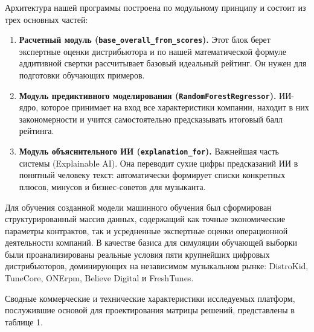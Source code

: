 \documentclass[14pt, a4paper]{extarticle}
\begin{document}
Архитектура нашей программы построена по модульному принципу и состоит из трех основных частей:
\begin{enumerate}
    \item \textbf{Расчетный модуль (\texttt{base\_overall\_from\_scores}).} Этот блок берет экспертные оценки дистрибьютора и по нашей математической формуле аддитивной свертки рассчитывает базовый идеальный рейтинг. Он нужен для подготовки обучающих примеров.
    \item \textbf{Модуль предиктивного моделирования (\texttt{RandomForestRegressor}).} ИИ-ядро, которое принимает на вход все характеристики компании, находит в них закономерности и учится самостоятельно предсказывать итоговый балл рейтинга.
    \item \textbf{Модуль объяснительного ИИ (\texttt{explanation\_for}).} Важнейшая часть системы (Explainable AI). Она переводит сухие цифры предсказаний ИИ в понятный человеку текст: автоматически формирует списки конкретных плюсов, минусов и бизнес-советов для музыканта.
\end{enumerate}
Для обучения созданной модели машинного обучения был сформирован структурированный массив данных, содержащий как точные экономические параметры контрактов, так и усредненные экспертные оценки операционной деятельности компаний. В качестве базиса для симуляции обучающей выборки были проанализированы реальные условия пяти крупнейших цифровых дистрибьюторов, доминирующих на независимом музыкальном рынке: DistroKid, TuneCore, ONErpm, Believe Digital и FreshTunes. 

Сводные коммерческие и технические характеристики исследуемых платформ, послужившие основой для проектирования матрицы решений, представлены в таблице 1.


\begin{table}[!htbp] 
\centering
\caption{Коммерческие условия и экспертные метрики музыкальных дистрибьюторов}
\label{tab:distributors}
\end{table}
\end{document}
